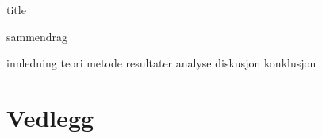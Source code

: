 



{title}
\newpage

\cleardoublepage
\tableofcontents
\newpage

{sammendrag}


{innledning}
{teori}
{metode}
{resultater}
{analyse}
{diskusjon}
{konklusjon}

\newpage

\printbibliography[heading=bibintoc]
\listoffigures

\section*{Vedlegg}


